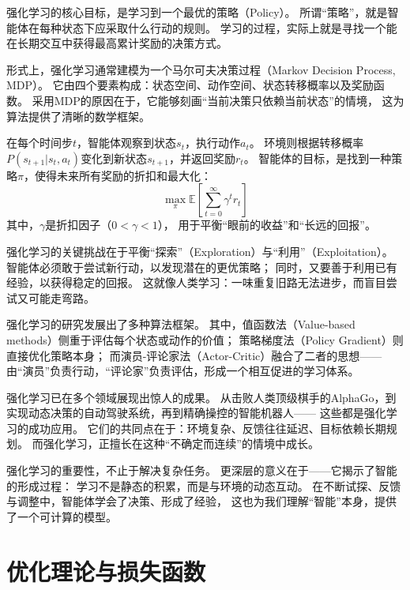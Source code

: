 强化学习的核心目标，是学习到一个最优的策略（Policy）。  
所谓“策略”，就是智能体在每种状态下应采取什么行动的规则。  
学习的过程，实际上就是寻找一个能在长期交互中获得最高累计奖励的决策方式。



形式上，强化学习通常建模为一个马尔可夫决策过程（Markov Decision Process, MDP）。  
它由四个要素构成：状态空间、动作空间、状态转移概率以及奖励函数。  
采用MDP的原因在于，它能够刻画“当前决策只依赖当前状态”的情境，  
这为算法提供了清晰的数学框架。



在每个时间步$t$，智能体观察到状态$s_t$，执行动作$a_t$。  
环境则根据转移概率$P(s_{t+1}|s_t, a_t)$变化到新状态$s_{t+1}$，并返回奖励$r_t$。  
智能体的目标，是找到一种策略$\pi$，使得未来所有奖励的折扣和最大化：
$$
\max_\pi \mathbb{E}\left[\sum_{t=0}^\infty \gamma^t r_t\right]
$$  
其中，$\gamma$是折扣因子（$0 < \gamma < 1$），  
用于平衡“眼前的收益”和“长远的回报”。



强化学习的关键挑战在于平衡“探索”（Exploration）与“利用”（Exploitation）。  
智能体必须敢于尝试新行动，以发现潜在的更优策略；  
同时，又要善于利用已有经验，以获得稳定的回报。  
这就像人类学习：一味重复旧路无法进步，而盲目尝试又可能走弯路。



强化学习的研究发展出了多种算法框架。  
其中，值函数法（Value-based methods）侧重于评估每个状态或动作的价值；  
策略梯度法（Policy Gradient）则直接优化策略本身；  
而演员-评论家法（Actor-Critic）融合了二者的思想——  
由“演员”负责行动，“评论家”负责评估，形成一个相互促进的学习体系。



强化学习已在多个领域展现出惊人的成果。  
从击败人类顶级棋手的AlphaGo，到实现动态决策的自动驾驶系统，再到精确操控的智能机器人——  
这些都是强化学习的成功应用。  
它们的共同点在于：环境复杂、反馈往往延迟、目标依赖长期规划。  
而强化学习，正擅长在这种“不确定而连续”的情境中成长。



强化学习的重要性，不止于解决复杂任务。  
更深层的意义在于——它揭示了智能的形成过程：  
学习不是静态的积累，而是与环境的动态互动。  
在不断试探、反馈与调整中，智能体学会了决策、形成了经验，  
这也为我们理解“智能”本身，提供了一个可计算的模型。

\section{优化理论与损失函数}

